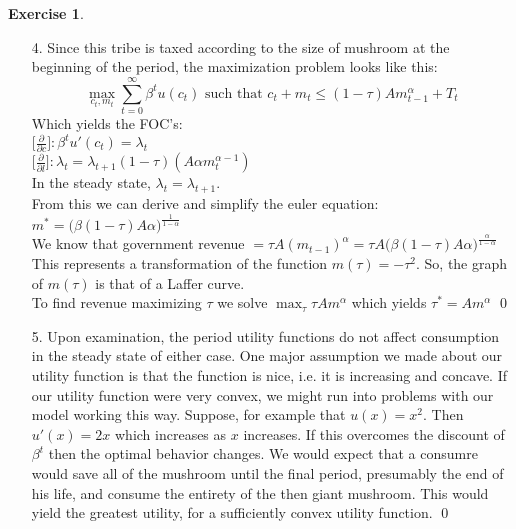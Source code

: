 \documentclass[12pt]{article}
\theoremstyle{definition}
\newtheorem{exercise}[theorem]{Exercise}
\newcommand{\V}{\vspace{0.3cm}\\}
\begin{document}
\begin{exercise}
\begin{enumerate}
    Which yields the following first order conditions: \V
    $\bigg[ \frac{\partial}{\partial c} \bigg] : \beta^t u'(c_t) = \lambda_t(1+\tau_c)$ \V
    $\bigg[ \frac{\partial}{\partial l} \bigg] : \beta\lambda_t = \lambda_{t+1}(A\alpha m_{t}^{\alpha-1})$ \V
    Note that in the steady state $\lambda_t = \lambda_{t+1}$. \V
    This leads to the simplified euler condition: $m^* = \displaystyle \big(\frac{A\alpha}{\beta}\big)^{\frac{1}{1-\alpha}}$ \V
    From this, we can know that the steady state implies saving $m$ has constant optimum. This limits flexibility of $c$. So, the taxation does not affect saving or consumption. \qed 
    \item [4.] Since this tribe is taxed according to the size of mushroom at the beginning of the period, the maximization problem looks like this: $$\max_{c_t,m_t} \sum_{t=0}^\infty \beta^t u(c_t) \text{ such that } c_t + m_t \leq (1-\tau)Am_{t-1}^\alpha + T_t$$
    Which yields the FOC's: \V
    $\bigg[ \frac{\partial}{\partial c} \bigg] : \beta^t u'(c_t) = \lambda_t$ \V
    $\bigg[ \frac{\partial}{\partial l} \bigg] : \lambda_t = \lambda_{t+1}(1-\tau)(A\alpha m_{t}^{\alpha-1})$ \V
    In the steady state, $\lambda_t = \lambda_{t+1}$. \V
    From this we can derive and simplify the euler equation: \\
    $m^* = \big(\beta(1-\tau)A\alpha \big)^\frac{1}{1-\alpha}$ \V
    We know that government revenue $= \tau A(m_{t-1})^\alpha = \tau A \big(\beta(1-\tau)A\alpha \big)^\frac{\alpha}{1-\alpha}$ \V
    This represents a transformation of the function $m(\tau) = -\tau^2$. So, the graph of $m(\tau)$ is that of a Laffer curve. 
    \vspace{4cm} \\
    
    To find revenue maximizing $\tau$ we solve $\max_{\tau} \tau Am^\alpha$ which yields $\tau^* = Am^\alpha$ \qed
        
    \item [5.] Upon examination, the period utility functions do not affect consumption in the steady state of either case. One major assumption we made about our utility function is that the function is nice, i.e. it is increasing and concave. If our utility function were very convex, we might run into problems with our model working this way. Suppose, for example that $u(x) = x^2$. Then $u'(x) = 2x$ which increases as $x$ increases. If this overcomes the discount of $\beta^t$ then the optimal behavior changes. We would expect that a consumre would save all of the mushroom until the final period, presumably the end of his life, and consume the entirety of the then giant mushroom. This would yield the greatest utility, for a sufficiently convex utility function. \qed  
    
\end{enumerate}
\end{exercise} 
\end{document}
